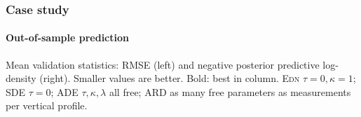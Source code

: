 \documentclass[handout]{snedecorbeamer}
\begin{document}
\begin{frame}%
  \label{frm:validation-statistics}
  \frametitle{Case study}
  \framesubtitle{Out-of-sample prediction}

  \begin{table}
    \caption{Mean validation statistics
      $\bar{v}^{(p, q)}$: RMSE (left) and negPPLD (right).
      Smaller values are better. Bold: best in class.}%
    \label{tab:validation-statistics-mini}
  \end{table}

  Mean validation statistics: RMSE (left) and negative posterior
  predictive log-density (right).  Smaller values are better. Bold: best
  in column. \textsc{Edn} $\tau = 0, \kappa = 1$; \textsc{SDE} $\tau =
  0$; \textsc{ADE} $\tau, \kappa, \lambda$ all free; \textsc{ARD} as
  many free parameters as measurements per vertical profile.
\end{frame}
\end{document}

